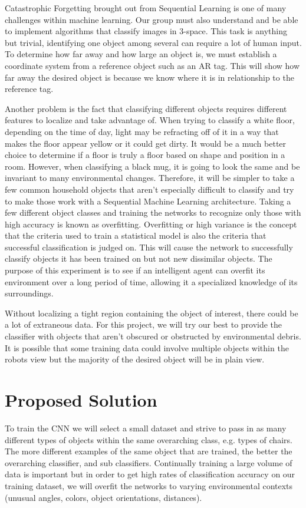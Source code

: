 \documentclass[a4paper, 10pt]{article}
\begin{document}
Catastrophic Forgetting brought out from Sequential Learning is one of many challenges within machine learning. Our group must also understand and be able to implement algorithms that classify images in 3-space. This task is anything but trivial, identifying one object among several can require a lot of human input. To determine how far away and how large an object is, we must establish a coordinate system from a reference object such as an AR tag. This will show how far away the desired object is because we know where it is in relationship to the reference tag. 
	
Another problem is the fact that classifying different objects requires different features to localize and take advantage of. When trying to classify a white floor, depending on the time of day, light may be refracting off of it in a way that makes the floor appear yellow or it could get dirty. It would be a much better choice to determine if a floor is truly a floor based on shape and position in a room. However, when classifying a black mug, it is going to look the same and be invariant to many environmental changes. Therefore, it will be simpler to take a few common household objects that aren't especially difficult to classify and try to make those work with a Sequential Machine Learning architecture. Taking a few different object classes and training the networks to recognize only those with high accuracy is known as overfitting. Overfitting or high variance is the concept that the criteria used to train a statistical model is also the criteria that successful classification is judged on. This will cause the network to successfully classify objects it has been trained on but not new dissimilar objects. The purpose of this experiment is to see if an intelligent agent can overfit its environment over a long period of time, allowing it a specialized knowledge of its surroundings.
	
Without localizing a tight region containing the object of interest, there could be a lot of extraneous data. For this project, we will try our best to provide the classifier with objects that aren't obscured or obstructed by environmental debris. It is possible that some training data could involve multiple objects within the robots view but the majority of the desired object will be in plain view.


\section{Proposed Solution}
To train the CNN we will select a small dataset and strive to pass in as many different types of objects within the same overarching class, e.g. types of chairs. The more different examples of the same object that are trained, the better the overarching classifier, and sub classifiers. Continually training a large volume of data is important but in order to get high rates of classification accuracy on our training dataset, we will overfit the networks to varying environmental contexts (unusual angles, colors, object orientations, distances).
	 
\end{document}
